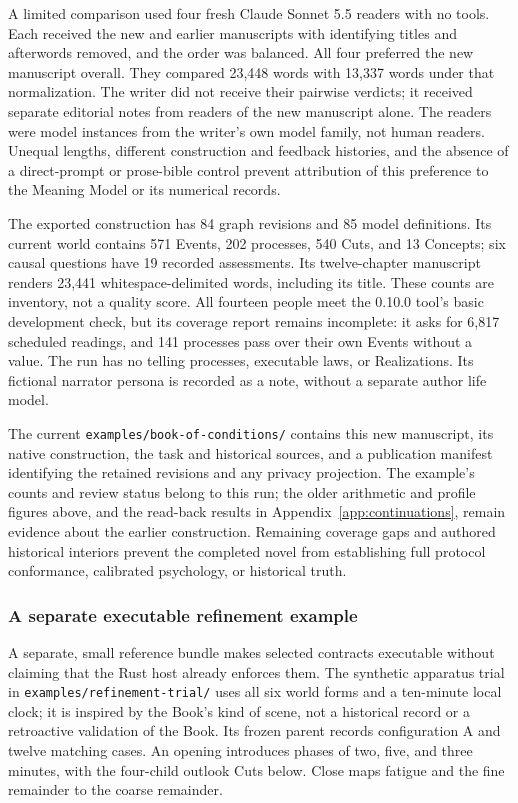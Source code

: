 \documentclass[11pt,a4paper]{article}
\begin{document}
A limited comparison used four fresh Claude Sonnet 5.5 readers with no tools.
Each received the new and earlier manuscripts with identifying titles and
afterwords removed, and the order was balanced. All four preferred the new
manuscript overall. They compared 23,448 words with 13,337 words under that
normalization. The writer did not receive their pairwise verdicts; it received
separate editorial notes from readers of the new manuscript alone. The readers
were model instances from the writer's own model family, not human readers.
Unequal lengths, different construction
and feedback histories, and the absence of a direct-prompt or prose-bible control
prevent attribution of this preference to the Meaning Model or its numerical
records.

The exported construction has 84 graph revisions and 85 model definitions.
Its current world contains 571 Events, 202 processes, 540 Cuts, and 13 Concepts;
six causal questions have 19 recorded assessments. Its twelve-chapter manuscript
renders 23,441 whitespace-delimited words, including its title. These counts are inventory, not a
quality score. All fourteen people meet the 0.10.0 tool's basic development check,
but its coverage report remains incomplete: it asks for 6,817 scheduled
readings, and 141 processes pass over their own Events without a value.
The run has no telling processes, executable laws, or Realizations. Its
fictional narrator persona is recorded as a note, without a separate author
life model.

The current \texttt{examples/book-of-conditions/} contains this new manuscript,
its native construction, the task and historical sources, and a publication
manifest identifying the retained revisions and any privacy projection. The
example's counts and review status belong to this run; the older arithmetic and
profile figures above, and the read-back results in
Appendix~\ref{app:continuations}, remain evidence about the earlier
construction. Remaining coverage gaps and authored historical interiors prevent
the completed novel from establishing full protocol conformance, calibrated
psychology, or historical truth.

\subsubsection{A separate executable refinement example}
\label{sec:reference-refinement}

A separate, small reference bundle makes selected contracts executable without
claiming that the Rust host already enforces them. The synthetic apparatus
trial in \texttt{examples/refinement-trial/} uses all six world forms and a
ten-minute local clock; it is inspired by the Book's kind of scene, not a
historical record or a retroactive validation of the Book. Its frozen parent
records configuration A and twelve matching cases. An opening introduces
phases of two, five, and three minutes, with the four-child outlook Cuts below.
Close maps fatigue and the fine remainder to the coarse remainder.
\end{document}
